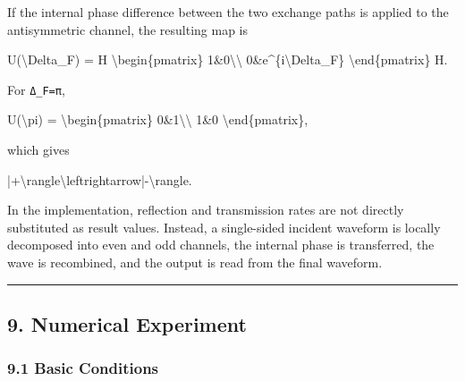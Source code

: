 \documentclass[
  a4paper,
]{article}
\newenvironment{Shaded}{}{}
\newcommand{\NormalTok}[1]{#1}
\begin{document}
If the internal phase difference between the two exchange paths is
applied to the antisymmetric channel, the resulting map is

\begin{Shaded}
\begin{Highlighting}[]
\NormalTok{U(\textbackslash{}Delta\_F)}
\NormalTok{=}
\NormalTok{H}
\NormalTok{\textbackslash{}begin\{pmatrix\}}
\NormalTok{1\&0\textbackslash{}\textbackslash{}}
\NormalTok{0\&e\^{}\{i\textbackslash{}Delta\_F\}}
\NormalTok{\textbackslash{}end\{pmatrix\}}
\NormalTok{H.}
\end{Highlighting}
\end{Shaded}

For \texttt{Δ\_F=π},

\begin{Shaded}
\begin{Highlighting}[]
\NormalTok{U(\textbackslash{}pi)}
\NormalTok{=}
\NormalTok{\textbackslash{}begin\{pmatrix\}}
\NormalTok{0\&1\textbackslash{}\textbackslash{}}
\NormalTok{1\&0}
\NormalTok{\textbackslash{}end\{pmatrix\},}
\end{Highlighting}
\end{Shaded}

which gives

\begin{Shaded}
\begin{Highlighting}[]
\NormalTok{|+\textbackslash{}rangle\textbackslash{}leftrightarrow|{-}\textbackslash{}rangle.}
\end{Highlighting}
\end{Shaded}

In the implementation, reflection and transmission rates are not
directly substituted as result values. Instead, a single-sided incident
waveform is locally decomposed into even and odd channels, the internal
phase is transferred, the wave is recombined, and the output is read
from the final waveform.

\begin{center}\rule{0.5\linewidth}{0.5pt}\end{center}

\subsection{9. Numerical Experiment}\label{numerical-experiment}

\subsubsection{9.1 Basic Conditions}\label{basic-conditions}
\end{document}
